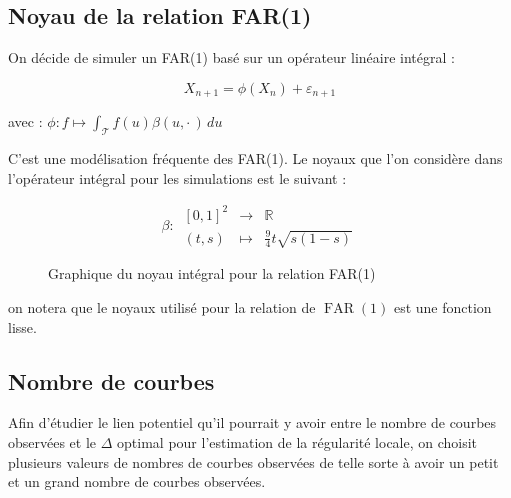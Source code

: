\subsection{Noyau de la relation FAR(1)}
\begin{minipage}{0.48\linewidth}
	On décide de simuler un FAR(1) basé sur un opérateur linéaire intégral :

	$$
		X_{n+1} = \phi(X_n) + \varepsilon_{n+1}
	$$

	avec : $\phi : f \mapsto \displaystyle\int_{\mathcal T} f(u) \beta(u, \cdot \,) \, du$

	C'est une modélisation fréquente des FAR(1). Le noyaux que l'on considère dans l'opérateur intégral pour les simulations est le suivant :


	$$
		\beta : \, \begin{array}{ccc}
			[0,1]^2 & \longrightarrow & \mathbb R
			\\
			(t,s)   & \longmapsto     & \frac 9 4 t\sqrt{ s(1-s) }
		\end{array}
	$$

\end{minipage}
\hfill
\begin{minipage}{0.48\linewidth}
	\begin{figure}[H]
		\centering
		\caption{Graphique du noyau intégral pour la relation FAR(1)}
		\label{graph:far_kernel}
	\end{figure}
\end{minipage}

\bigskip

on notera que le noyaux utilisé pour la relation de $\operatorname{FAR}(1)$ est une fonction lisse. 

\subsection{Nombre de courbes}

Afin d'étudier le lien potentiel qu'il pourrait y avoir entre le nombre de courbes observées et le $\Delta$ optimal pour l'estimation de la régularité locale, on choisit plusieurs valeurs de nombres de courbes observées de telle sorte à avoir un \og petit \fg et un \og grand \fg nombre de courbes observées.

